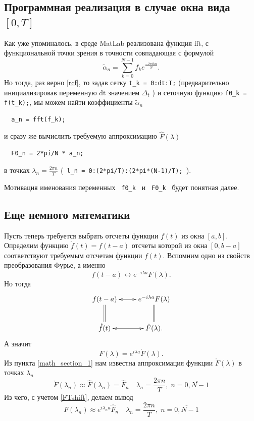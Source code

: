 \documentclass[oneside,final,11pt]{article}
\newcommand\segm[2]{[#1,#2]}
\newcommand\lm{\lambda}
\begin{document}
	\subsection{Программная реализация в случае окна вида \(\segm{0}{T}\)} \label{prog_section_1}
		Как уже упоминалось, в среде {\ttfamily MatLab} реализована функция {\ttfamily fft}, с функциональной точки
		зрения в точности совпадающая с формулой
		\[ \tilde \alpha_n = \sum_{k=0}^{N-1} f_k e^{\frac{-2\pi ikn}{N}}. \]
		Но тогда, раз верно \eqref{rcf}, то задав сетку \verb !t_k = 0:dt:T;!
		(предварительно инициализировав переменную {\ttfamily dt} значением \( \Delta_t \) ) и сеточную функцию
		 \verb !f0_k = f(t_k);!,
		мы можем найти коэффициенты \( \tilde\alpha_n \)
		\begin{verbatim}  a_n = fft(f_k); \end{verbatim}
		и сразу же вычислить требуемую аппроксимацию \( \hat F(\lm) \)
		\begin{verbatim}  F0_n = 2*pi/N * a_n; \end{verbatim}
 		в точках \( \lm_n = \frac{2\pi n}{T} \) \quad (\verb ! l_n = 0:(2*pi/T):(2*pi*(N-1)/T); !).
		
		Мотивация именования переменных \verb ! f0_k ! и \verb ! F0_k ! будет понятная далее.

	\subsection{Еще немного математики}
		Пусть теперь требуется выбрать отсчеты функции \(f(t)\) из окна \(\segm{a}{b}\). Определим функцию
		\(\mathring f(t)  = f(t-a)\) отсчеты которой из окна \(\segm{0}{b-a}\) соответствуют требуемым отсчетам
		функции \(f(t)\). Вспомним одно из свойств преобразования Фурье, а именно
		\[ f(t-a) \leftrightarrow e^{-i\lm a} F(\lm). \]
		Но тогда
		\[ \xymatrix{
		f(t-a)  \ar@{=}[d] \ar@{<->}[r] & e^{-i\lm a} F(\lm) \ar@{=}[d] \\
		\mathring f(t) \ar@{<->}[r] & \mathring F(\lm). \\
		} \]
		А значит
		\begin{equation} \label{FTshift} 
			F(\lm) = e^{i\lm a} \mathring F(\lm). 
		\end{equation}
		Из пункта \ref{math_section_1} нам известна аппроксимация функции \(\mathring F(\lm) \) в точках \( \lm_n \)
		\[ \mathring F(\lm_n)  \approx \hat F(\lm_n) = \hat F_n \quad\lambda_n = \frac{2\pi n}{T}, \; n = \overline{0, N-1} \]
		Из чего, с учетом \eqref{FTshift}, делаем вывод
		\begin{equation} \label{approx}
			F(\lm_n) \approx e^{i\lm_n a} \hat F_n \quad\lambda_n = \frac{2\pi n}{T}, \; n = \overline{0, N-1} 
		\end{equation}
\end{document}
